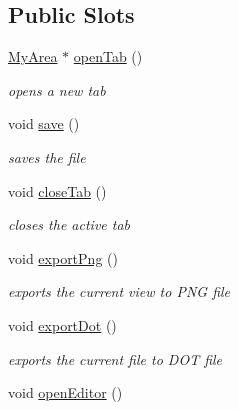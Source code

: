 \subsection*{Public Slots}
\begin{DoxyCompactItemize}
\item 
\hyperlink{classMyArea}{My\+Area} $\ast$ \hyperlink{classMainWindow_ad5bf28e8dd9343b4716b90ce2be83d64}{open\+Tab} ()
\begin{DoxyCompactList}\small\item\em opens a new tab \end{DoxyCompactList}\item 
\hypertarget{classMainWindow_a3ba1a371fb10e731ae0926ae85efeb4f}{void \hyperlink{classMainWindow_a3ba1a371fb10e731ae0926ae85efeb4f}{save} ()}\label{classMainWindow_a3ba1a371fb10e731ae0926ae85efeb4f}

\begin{DoxyCompactList}\small\item\em saves the file \end{DoxyCompactList}\item 
\hypertarget{classMainWindow_af622a541e4d87f86e9e83d29af60fe19}{void \hyperlink{classMainWindow_af622a541e4d87f86e9e83d29af60fe19}{close\+Tab} ()}\label{classMainWindow_af622a541e4d87f86e9e83d29af60fe19}

\begin{DoxyCompactList}\small\item\em closes the active tab \end{DoxyCompactList}\item 
\hypertarget{classMainWindow_a111875a1d82e77178636322ab485e4bb}{void \hyperlink{classMainWindow_a111875a1d82e77178636322ab485e4bb}{export\+Png} ()}\label{classMainWindow_a111875a1d82e77178636322ab485e4bb}

\begin{DoxyCompactList}\small\item\em exports the current view to P\+N\+G file \end{DoxyCompactList}\item 
\hypertarget{classMainWindow_a0423cda4bfa3846796523893e2deb5f1}{void \hyperlink{classMainWindow_a0423cda4bfa3846796523893e2deb5f1}{export\+Dot} ()}\label{classMainWindow_a0423cda4bfa3846796523893e2deb5f1}

\begin{DoxyCompactList}\small\item\em exports the current file to D\+O\+T file \end{DoxyCompactList}\item 
\hypertarget{classMainWindow_aafce9e112fde4466c72e1e49dd7c87e6}{void \hyperlink{classMainWindow_aafce9e112fde4466c72e1e49dd7c87e6}{open\+Editor} ()}\label{classMainWindow_aafce9e112fde4466c72e1e49dd7c87e6}


\end{DoxyCompactItemize}
